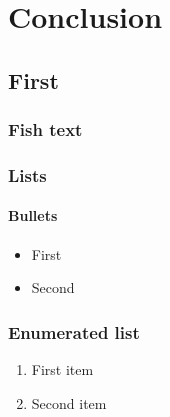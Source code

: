\chapter{Conclusion}
\section{First}
\subsection{Fish text}
\lipsum

\subsection{Lists}
\subsubsection{Bullets}
\begin{itemize}
	\item First
	\item Second
\end{itemize}

\subsection{Enumerated list}
\begin{enumerate}
	\item First item
	\item Second item
\end{enumerate}